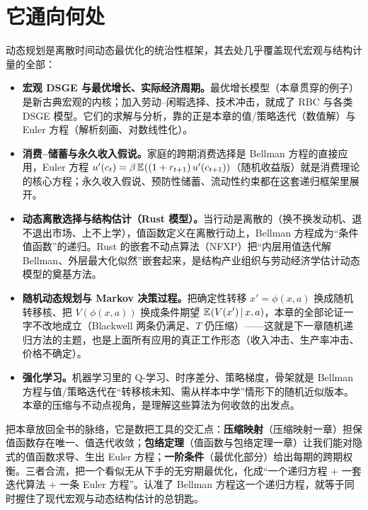 \section{它通向何处}
\label{sec:dp-beyond}

动态规划是离散时间动态最优化的统治性框架，其去处几乎覆盖现代宏观与结构计量的全部：

\begin{itemize}
    \item \textbf{宏观 DSGE 与最优增长、实际经济周期。}最优增长模型（本章贯穿的例子）是新古典宏观的内核；加入劳动--闲暇选择、技术冲击，就成了 RBC 与各类 DSGE 模型。它们的求解与分析，靠的正是本章的值/策略迭代（数值解）与 Euler 方程（解析刻画、对数线性化）。
    \item \textbf{消费--储蓄与永久收入假说。}家庭的跨期消费选择是 Bellman 方程的直接应用，Euler 方程 $u'(c_t)=\beta\,\mathbb{E}_{}\!\left((1+r_{t+1})\,u'(c_{t+1})\right)$（随机收益版）就是消费理论的核心方程；永久收入假说、预防性储蓄、流动性约束都在这套递归框架里展开。
    \item \textbf{动态离散选择与结构估计（Rust 模型）。}当行动是离散的（换不换发动机、退不退出市场、上不上学），值函数定义在离散行动上，Bellman 方程成为``条件值函数''的递归。Rust 的嵌套不动点算法（NFXP）把``内层用值迭代解 Bellman、外层最大化似然''嵌套起来，是结构产业组织与劳动经济学估计动态模型的奠基方法。
    \item \textbf{随机动态规划与 Markov 决策过程。}把确定性转移 $x'=\phi(x,a)$ 换成随机转移核、把 $V(\phi(x,a))$ 换成条件期望 $\mathbb{E}_{}\!\left(V(x')\,\middle|\, x,a\right)$，本章的全部论证一字不改地成立（Blackwell 两条仍满足、$T$ 仍压缩）——这就是下一章随机递归方法的主题，也是上面所有应用的真正工作形态（收入冲击、生产率冲击、价格不确定）。
    \item \textbf{强化学习。}机器学习里的 Q-学习、时序差分、策略梯度，骨架就是 Bellman 方程与值/策略迭代在``转移核未知、需从样本中学''情形下的随机近似版本。本章的压缩与不动点视角，是理解这些算法为何收敛的出发点。
\end{itemize}

把本章放回全书的脉络，它是数把工具的交汇点：\textbf{压缩映射}（压缩映射一章）担保值函数存在唯一、值迭代收敛；\textbf{包络定理}（值函数与包络定理一章）让我们能对隐式的值函数求导、生出 Euler 方程；\textbf{一阶条件}（最优化部分）给出每期的跨期权衡。三者合流，把一个看似无从下手的无穷期最优化，化成``一个递归方程 $+$ 一套迭代算法 $+$ 一条 Euler 方程''。认准了 Bellman 方程这一个递归方程，就等于同时握住了现代宏观与动态结构估计的总钥匙。
